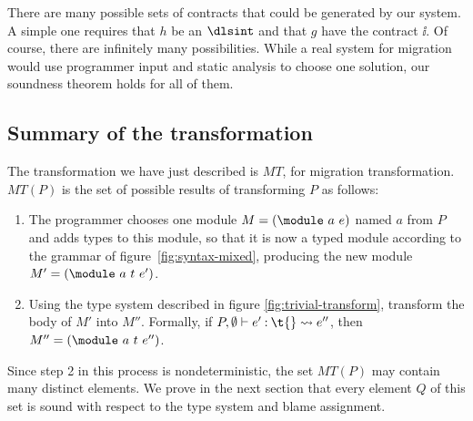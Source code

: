 \begin{schemeregion}
There are many possible sets of contracts that could be generated by
our system.  A simple one requires that $h$ be an $\dlsint$ and that $g$
have the contract $\ii$.  Of course, there are infinitely many
possibilities.  While a real system for migration would use
programmer input and static analysis to choose one solution, our
soundness theorem holds for all of them.  


\subsection{Summary of the transformation}

The transformation we have just described is $MT$, for
migration transformation.
$MT(P)$ is the set of possible results of transforming $P$ as follows:
\begin{enumerate}
\item The programmer chooses one module $M = \modu{a}{e}$ named $a$ from $P$
  and adds types to this module, so that it is now a typed module
  according to the grammar of figure~\ref{fig:syntax-mixed}, producing
  the new module
  $M' = \mt{a}{t}{e'}$.
\item Using the type system described in figure
  \ref{fig:trivial-transform}, transform the body of $M'$ into $M''$.
  Formally, if $\ttproves{\emptyset}{e'}{\t{}}{e''}$, then $M'' = \mt{a}{t}{e''}$.
\end{enumerate}
\noindent

Since step 2 in this process is nondeterministic, the set $MT(P)$ may
contain many distinct elements.  We prove in the next section that
every element $Q$ of this set is sound with respect to the type
system and blame assignment.

\end{schemeregion}
